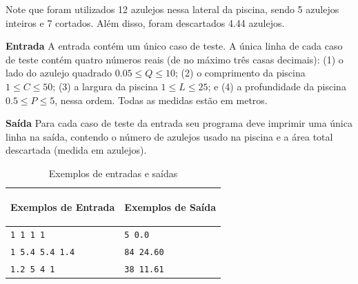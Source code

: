 Note que foram utilizados 12 azulejos nessa lateral da piscina, sendo 5 azulejos inteiros e 7 cortados. Além disso, foram descartados 4.44 azulejos. 

\vspace{0.3cm}
\textbf{Entrada}
A entrada contém um único caso de teste.
A única linha de cada caso de teste contém quatro números reais (de no máximo três casas decimais): (1) o lado do azulejo quadrado $0.05 \leq Q \leq 10$; (2) o comprimento da piscina $1 \leq C \leq 50$; (3) a largura da piscina $1 \leq L \leq 25$; e (4) a profundidade da piscina $0.5 \leq P \leq 5$, nessa ordem. Todas as medidas estão em metros. 

\vspace{0.3cm}
\textbf{Saída}
Para cada caso de teste da entrada seu programa deve imprimir uma única linha na saída, contendo o número de azulejos usado na piscina e a área total descartada (medida em azulejos). 

\begin{table}[h]
    \centering
    \begin{tabular}{|p{7cm}|p{7cm}|}
        \hline
        \begin{center}
            \vspace{-0.3cm}
            \textbf{Exemplos de Entrada}
            \vspace{-0.3cm}
        \end{center} 
         &  
        \begin{center}
            \vspace{-0.3cm}
            \textbf{Exemplos de Saída}
            \vspace{-0.3cm}
        \end{center} \\ \hline
        \texttt{1 1 1 1} & \texttt{5 0.0} \\ \hline
        \texttt{1 5.4 5.4 1.4} & \texttt{84 24.60} \\ \hline
        \texttt{1.2 5 4 1} & \texttt{38 11.61} \\ \hline
    \end{tabular}
    \caption{Exemplos de entradas e saídas}
    \label{tab:inputc}
\end{table}

\newpage

\begin{center}
\noindent

\end{center}